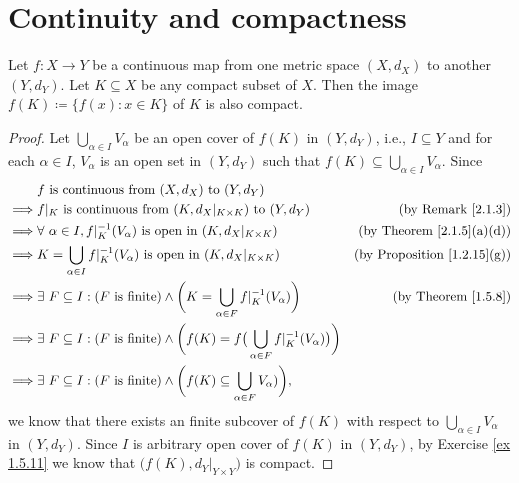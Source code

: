 \section{Continuity and compactness}\label{sec 2.3}

\begin{theorem}\label{2.3.1}
    Let \(f : X \to Y\) be a continuous map from one metric space \((X, d_X)\) to another \((Y, d_Y)\).
    Let \(K \subseteq X\) be any compact subset of \(X\).
    Then the image \(f(K) \coloneqq \{f(x) : x \in K\}\) of \(K\) is also compact.
\end{theorem}

\begin{proof}
    Let \(\bigcup_{\alpha \in I} V_\alpha\) be an open cover of \(f(K)\) in \((Y, d_Y)\), i.e., \(I \subseteq Y\) and for each \(\alpha \in I\), \(V_{\alpha}\) is an open set in \((Y, d_Y)\) such that \(f(K) \subseteq \bigcup_{\alpha \in I} V_\alpha\).
    Since
    \begin{align*}
                 & f \text{ is continuous from } (X, d_X) \text{ to } (Y, d_Y)                                                                                                             \\
        \implies & f|_K \text{ is continuous from } (K, d_X|_{K \times K}) \text{ to } (Y, d_Y)                                                  & \text{(by Remark \ref{2.1.3})}          \\
        \implies & \forall\ \alpha \in I, f|_K^{-1}(V_\alpha) \text{ is open in } (K, d_X|_{K \times K})                                         & \text{(by Theorem \ref{2.1.5}(a)(d))}   \\
        \implies & K = \bigcup_{\alpha \in I} f|_K^{-1}(V_\alpha) \text{ is open in } (K, d_X|_{K \times K})                                     & \text{(by Proposition \ref{1.2.15}(g))} \\
        \implies & \exists\ F \subseteq I : (F \text{ is finite}) \land \bigg(K = \bigcup_{\alpha \in F} f|_K^{-1}(V_\alpha)\bigg)               & \text{(by Theorem \ref{1.5.8})}         \\
        \implies & \exists\ F \subseteq I : (F \text{ is finite}) \land \bigg(f(K) = f\big(\bigcup_{\alpha \in F} f|_K^{-1}(V_\alpha)\big)\bigg)                                           \\
        \implies & \exists\ F \subseteq I : (F \text{ is finite}) \land \bigg(f(K) \subseteq \bigcup_{\alpha \in F} V_\alpha)\bigg),
    \end{align*}
    we know that there exists an finite subcover of \(f(K)\) with respect to \(\bigcup_{\alpha \in I} V_\alpha\) in \((Y, d_Y)\).
    Since \(I\) is arbitrary open cover of \(f(K)\) in \((Y, d_Y)\), by Exercise \ref{ex 1.5.11} we know that \(\big(f(K), d_Y|_{Y \times Y}\big)\) is compact.
\end{proof}

